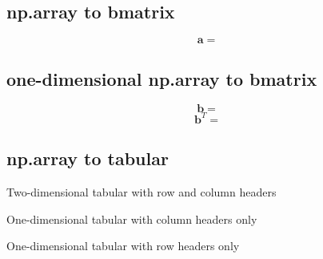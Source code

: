 \documentclass{report}
\begin{document}
\subsection*{np.array to bmatrix}
\begin{equation}
\mathbf{a} = 
\end{equation}

\subsection*{one-dimensional np.array to bmatrix}
\begin{equation}
\mathbf{b} = 
\end{equation}
\begin{equation}
\mathbf{b}^T = 
\end{equation}

\subsection*{np.array to tabular}
\begin{table}[H]
\centering

\caption{Two-dimensional tabular with row and column headers}
\end{table}

\begin{table}[H]
\centering

\caption{One-dimensional tabular with column headers only}
\end{table}

\begin{table}[H]
\centering

\caption{One-dimensional tabular with row headers only}
\end{table}
\end{document}
